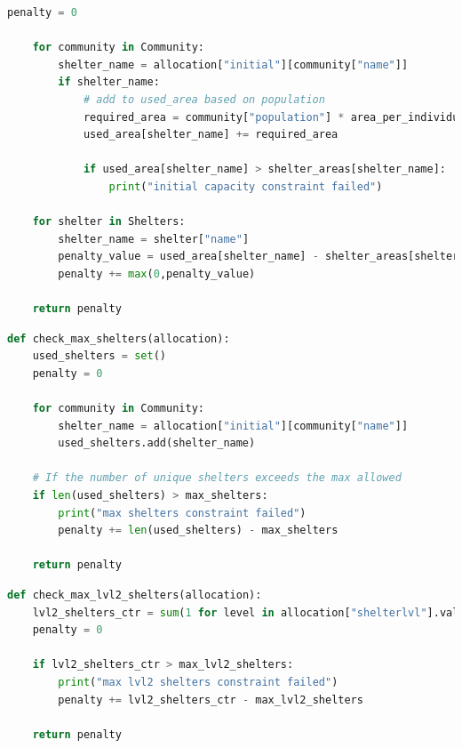 \begin{appendices}
\begin{centerappendixtitle}
\begin{lstlisting}[language=Python,caption={Capacity Constraint}, label={capCode}]
    penalty = 0

    for community in Community:
        shelter_name = allocation["initial"][community["name"]]
        if shelter_name:
            # add to used_area based on population
            required_area = community["population"] * area_per_individual
            used_area[shelter_name] += required_area

            if used_area[shelter_name] > shelter_areas[shelter_name]:
                print("initial capacity constraint failed")

    for shelter in Shelters:
        shelter_name = shelter["name"]
        penalty_value = used_area[shelter_name] - shelter_areas[shelter_name]
        penalty += max(0,penalty_value)

    return penalty
\end{lstlisting}

\begin{lstlisting}[language=Python,caption={Maximum Shelter Constraint}, label={maxshelCode}]
def check_max_shelters(allocation):
    used_shelters = set() 
    penalty = 0

    for community in Community:
        shelter_name = allocation["initial"][community["name"]]
        used_shelters.add(shelter_name)  

    # If the number of unique shelters exceeds the max allowed
    if len(used_shelters) > max_shelters:
        print("max shelters constraint failed")
        penalty += len(used_shelters) - max_shelters
            
    return penalty
\end{lstlisting}

\pagebreak
\begin{lstlisting}[language=Python,caption={Maximum Level 2 Shelter Constraint}, label={maxl2shelCode}]
def check_max_lvl2_shelters(allocation):
    lvl2_shelters_ctr = sum(1 for level in allocation["shelterlvl"].values() if level == 2)
    penalty = 0

    if lvl2_shelters_ctr > max_lvl2_shelters:
        print("max lvl2 shelters constraint failed")
        penalty += lvl2_shelters_ctr - max_lvl2_shelters 

    return penalty
\end{lstlisting}
		
		
		
	\end{centerappendixtitle}
	
	\begin{centerappendixtitle}

\end{centerappendixtitle}
\end{appendices}
